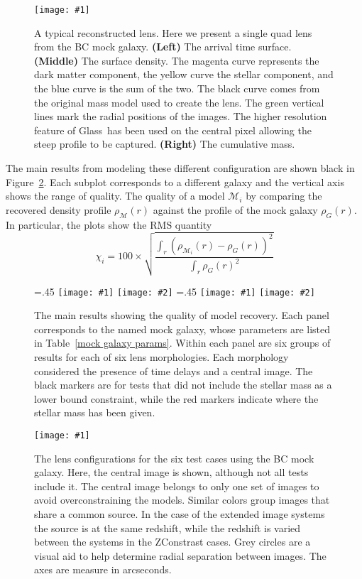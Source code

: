 \documentclass[onecolumn,galley]{mn2e}
\newcommand{\Glass}{{\sc Glass}}
\newcommand{\M}{\ensuremath{\mathscr{M}}}
\newcommand{\tabref}[1] {Table~\ref{#1}}
\newcommand{\figref}[1] {Figure~\ref{#1}}
\newcommand\plotone[1]{%
 \centering
 \leavevmode
 \texttt{[image: \#1]}%
}%
\newcommand\plottwo[2]{{%
 \centering
 \leavevmode
 \columnwidth=.45\columnwidth
 \texttt{[image: \#1]}%
 \hfil
 \texttt{[image: \#2]}%
}}%
\begin{document}
\begin{figure}
\plotone{BCQuadR1a_TmS.pdf}
\caption{A typical reconstructed lens. Here we present a single quad lens from 
the BC mock galaxy.
\textbf{(Left)}
The arrival time surface. 
\textbf{(Middle)}
The surface density. The magenta curve represents the dark matter component,
the yellow curve the stellar component, and the blue curve is the sum of the two.
The black curve comes from the original mass model used to create the lens.
The green vertical lines mark the radial positions of the images. The higher
resolution feature of \Glass\ has been used on the central pixel allowing the
steep profile to be captured.
\textbf{(Right)}
The cumulative mass.}
\label{reconstruction}
\end{figure}

The main results from modeling these different configuration are shown black in
\figref{main results}. Each subplot corresponds to a different galaxy and
the vertical axis shows the range of quality.  The quality of a
model $\M_i$ by comparing the recovered density profile $\rho_\M(r)$ against
the profile of the mock galaxy $\rho_G(r)$.  In particular, the plots show the
RMS quantity
%
\begin{equation}
  \chi_i = 100 \times \sqrt{\frac{\int_r (\rho_{\M_i}(r) - \rho_G(r))^2}{\int_r \rho_G(r)^2}}
\end{equation}
%

\begin{figure}
\plottwo{AAchi2_profile.pdf}{BBchi2_profile.pdf}
\plottwo{ACchi2_profile.pdf}{BCchi2_profile.pdf}
\caption{The main results showing the quality of model recovery. Each panel corresponds to 
the named mock galaxy, whose parameters are listed in \tabref{mock galaxy params}. Within
each panel are six groups of results for each of six lens morphologies. Each morphology
considered the presence of time delays and a central image. The black markers are for tests
that did not include the stellar mass as a lower bound constraint, while the red markers
indicate where the stellar mass has been given.}
\label{main results}
\end{figure}

\begin{figure}
\plotone{BCarrival_surfaces}
\caption{The lens configurations for the six test cases using the BC mock galaxy. Here,
the central image is shown, although not all tests include it. The central image belongs
to only one set of images to avoid overconstraining the models. Similar colors group
images that share a common source. In the case of the extended image systems the source
is at the same redshift, while the redshift is varied between the systems in the 
ZConstrast cases. Grey circles are a visual aid to help determine radial separation
between images. The axes are measure in arcseconds.}
\label{reconstruction}
\end{figure}
\end{document}
